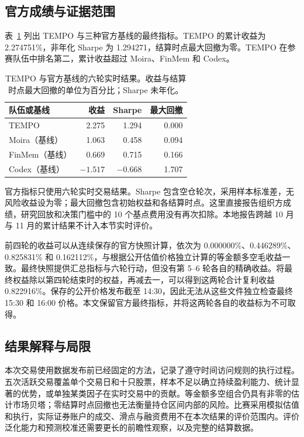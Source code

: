 \documentclass[conference]{IEEEtran}
\begin{document}
\subsection{官方成绩与证据范围}
表~\ref{tab:live_results} 列出 TEMPO 与三种官方基线的最终指标\cite{task2livefinal}。TEMPO 的累计收益为 2.274751\%，非年化 Sharpe 为 1.294271，结算时点最大回撤为零。TEMPO 在参赛队伍中排名第二，累计收益超过 Moira、FinMem 和 Codex。

\begin{table}[!tb]
\centering
\caption{TEMPO 与官方基线的六轮实时结果。收益与结算时点最大回撤的单位为百分比；Sharpe 未年化。}
\label{tab:live_results}
\begin{tabular}{lrrr}
\toprule
队伍或基线 & 收益 & Sharpe & 最大回撤\\
\midrule
TEMPO & 2.275 & 1.294 & 0.000\\
Moira（基线） & 1.063 & 0.458 & 0.094\\
FinMem（基线） & 0.669 & 0.715 & 0.166\\
Codex（基线） & $-1.517$ & $-0.668$ & 1.707\\
\bottomrule
\end{tabular}
\end{table}

官方指标只使用六轮实时交易结果。Sharpe 包含空仓轮次，采用样本标准差，无风险收益设为零；最大回撤包含初始权益和各结算时点\cite{task2protocol}。这里直接报告组织方成绩，研究回放和决策门槛中的 10 个基点费用没有再次扣除。本地报告跨越 10 月与 11 月的累计结果不计入本节实时评价。

前四轮的收益可以从连续保存的官方快照计算，依次为 0.000000\%、0.446289\%、0.825831\% 和 0.162112\%，与根据公开估值价格独立计算的等金额多空毛收益一致。最终快照提供汇总指标与六轮行动，但没有第 5--6 轮各自的精确收益。将最终权益除以第四轮结束时的权益，再减去一，可以得到这两轮合计复利收益 0.822916\%。保存的公开价格发布截至 14:30，因此无法从这些文件独立检查最终 15:30 和 16:00 价格。本文保留官方最终指标，并将这两轮各自的收益标为不可取得。

\subsection{结果解释与局限}
本次交易使用数据发布前已经固定的方法，记录了遵守时间访问规则的执行过程。五次活跃交易覆盖单个交易日和十只股票，样本不足以确立持续盈利能力、统计显著的优势，或单独某类因子在实时交易中的贡献。等金额多空组合仍具有非零的估计市场贝塔；零结算时点回撤也无法衡量持仓区间内部的风险。比赛采用模拟估值和执行，实际证券账户的成交、滑点与融资费用不在本次结果的评价范围内。评价泛化能力和预测校准还需要更长的前瞻性观察，以及完整的结算数据。
\end{document}
